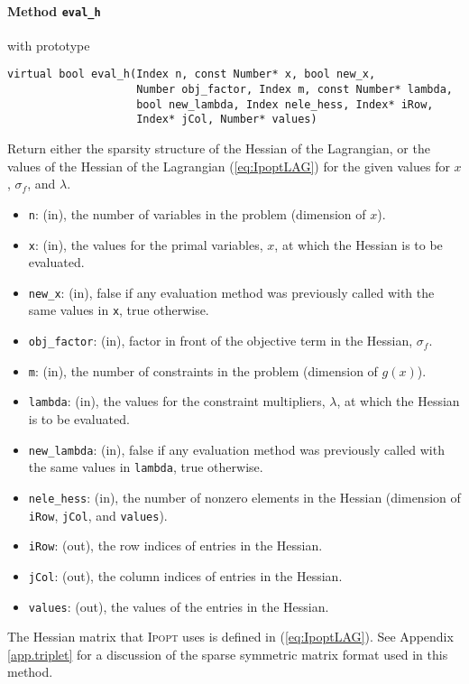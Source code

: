 \documentclass[10pt]{article}
\newcommand{\Ipopt}{\textsc{Ipopt}\xspace}
\begin{document}
\paragraph{Method {\texttt{eval\_h}}} with prototype
\begin{verbatim}
virtual bool eval_h(Index n, const Number* x, bool new_x,
                    Number obj_factor, Index m, const Number* lambda,
                    bool new_lambda, Index nele_hess, Index* iRow,
                    Index* jCol, Number* values)
\end{verbatim}
Return either the sparsity structure of the Hessian of the Lagrangian, or the values of the 
Hessian of the Lagrangian (\ref{eq:IpoptLAG}) for the given values for $x$,
$\sigma_f$, and $\lambda$.
\begin{itemize}
\item {\tt n}: (in), the number of variables in the problem (dimension
  of $x$).
\item {\tt x}: (in), the values for the primal variables, $x$, at which
  the Hessian is to be evaluated.
\item {\tt new\_x}: (in), false if any evaluation method was previously called 
        with the same values in {\tt x}, true otherwise.
\item {\tt obj\_factor}: (in), factor in front of the objective term
  in the Hessian, $\sigma_f$.
\item {\tt m}: (in), the number of constraints in the problem (dimension of $g(x)$).
\item {\tt lambda}: (in), the values for the constraint multipliers,
  $\lambda$, at which the Hessian is to be evaluated.
\item {\tt new\_lambda}: (in), false if any evaluation method was
  previously called with the same values in {\tt lambda}, true
  otherwise.
\item {\tt nele\_hess}: (in), the number of nonzero elements in the
  Hessian (dimension of {\tt iRow}, {\tt jCol}, and {\tt values}).
\item {\tt iRow}: (out), the row indices of entries in the Hessian.
\item {\tt jCol}: (out), the column indices of entries in the Hessian.
\item {\tt values}: (out), the values of the entries in the Hessian.
\end{itemize}

The Hessian matrix that \Ipopt uses is defined in
(\ref{eq:IpoptLAG}).  See Appendix \ref{app.triplet} for a
discussion of the sparse symmetric matrix format used in this method.
\end{document}
